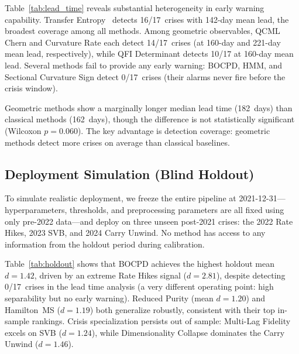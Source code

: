 \documentclass[3p]{elsarticle}
\begin{document}
\begin{table}[htb]
\centering
\caption{Lead time analysis: early warning across 17~crises.
  Methods sorted by detection rate $\times$ mean lead time.
  Friedman $\chi^2 = 155.8$, $p = 3.2 \times 10^{-18}$.}
\label{tab:lead_time}
\small

\end{table}

Table~\ref{tab:lead_time} reveals substantial heterogeneity in
early warning capability.  Transfer Entropy~\cite{schreiber2000}
detects 16/17~crises with 142-day mean lead, the broadest coverage
among all methods.  Among geometric observables, QCML Chern and
Curvature Rate each detect 14/17~crises (at 160-day and 221-day mean
lead, respectively), while QFI Determinant detects 10/17 at 160-day
mean lead.  Several methods fail to provide any early warning:
BOCPD, HMM, and Sectional Curvature Sign detect 0/17~crises
(their alarms never fire before the crisis window).

Geometric methods show a marginally longer median lead time (182~days)
than classical methods (162~days), though the difference is not
statistically significant (Wilcoxon $p = 0.060$).  The key
advantage is detection coverage: geometric methods detect more crises
on average than classical baselines.

\subsection{Deployment Simulation (Blind Holdout)}\label{subsec:holdout}

To simulate realistic deployment, we freeze the entire pipeline at
2021-12-31---hyperparameters, thresholds, and preprocessing
parameters are all fixed using only pre-2022 data---and deploy on
three unseen post-2021 crises: the 2022 Rate Hikes, 2023 SVB, and
2024 Carry Unwind.  No method has access to any information from the
holdout period during calibration.

\begin{table}[htb]
\centering
\caption{Blind holdout simulation (pipeline frozen at 2021-12-31).
  Top 15 methods on three unseen crises, sorted by mean Cohen's~$d$.
  Bold = best per-crisis column.}
\label{tab:holdout}
\small

\end{table}

Table~\ref{tab:holdout} shows that BOCPD achieves the highest holdout
mean $d = 1.42$, driven by an extreme Rate Hikes signal ($d = 2.81$),
despite detecting 0/17~crises in the lead time analysis (a very
different operating point: high separability but no early warning).
Reduced Purity (mean $d = 1.20$) and Hamilton~MS ($d = 1.19$) both
generalize robustly, consistent with their top in-sample rankings.
Crisis specialization persists out of sample: Multi-Lag Fidelity excels
on SVB ($d = 1.24$), while Dimensionality Collapse dominates the Carry
Unwind ($d = 1.46$).
\end{document}
